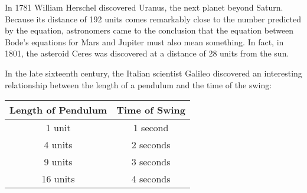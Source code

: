\documentclass[fleqn,addpoints]{exam}
\begin{document}
\begin{questions}

In 1781 William Herschel discovered Uranus, the next planet beyond Saturn.  Because its distance of 192 units comes
remarkably close to the number predicted by the equation, astronomers came to the conclusion that the equation between
Bode's equations for Mars and Jupiter must also mean something.  In fact, in 1801, the asteroid Ceres was discovered at
a distance of 28 units from the sun.

\question

In the late sixteenth century, the Italian scientist Galileo discovered an interesting relationship between the
length of a pendulum and the time of the swing:

\vspace{0.5 cm}
  \begin{tabular}{|c|c|}
    \hline
    Length of Pendulum  & Time of Swing \\ 
    \hline
    1 unit  & 1 second \\
    4 units & 2 seconds \\
    9 units & 3 seconds \\
    16 units & 4 seconds \\
    \hline
  \end{tabular}
\vspace{0.5 cm}

\end{questions}
\end{document}
